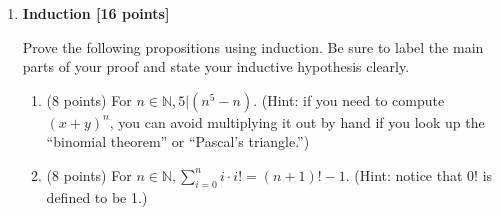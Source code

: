 \documentclass[12pt]{article}
\begin{document}
\begin{enumerate}
\begin{enumerate}
\begin{picture}
    \end{picture}
\end{enumerate}


\item \textbf{Induction [16 points]}

Prove the following propositions using induction.   Be sure to label the
main parts of your proof and state your inductive hypothesis clearly. 

\begin{enumerate}

\item (8 points) For $n \in \mathbb{N}, 5 | (n^{5} - n)$.  
(Hint: if you need to compute $(x+y)^n$, 
you can avoid multiplying it out by hand if you
look up the ``binomial theorem'' or ``Pascal's triangle.'')

\item (8 points) For $n \in \mathbb{N}, \displaystyle\sum\limits_{i=0}^n i \cdot i! = (n+1)! - 1$.
(Hint:   notice that $0!$ is defined to be 1.)

\end{enumerate}





\end{enumerate}
\end{document}
